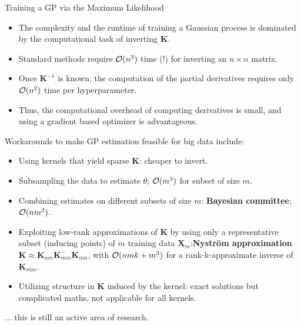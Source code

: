 \begin{frame}[c,allowframebreaks]{Training a GP via the Maximum Likelihood}
\begin{itemize}
  \item The complexity and the runtime of training a Gaussian process is dominated by the computational task of inverting $\bm{K}$.
  \lz
  \item Standard methods require $\mathcal{O}(n^3)$ time (!) for inverting an $n\times n$ matrix.
  \lz
  \item Once $\bm{K}^{-1}$ is known, the computation of the partial derivatives requires only $\mathcal{O}(n^2)$ time per hyperparameter.
  \lz
  \item[\faLightbulbO] Thus, the computational overhead of computing derivatives is small, and using a gradient based optimizer is advantageous.
\end{itemize}


\framebreak
Workarounds to make GP estimation feasible for big data include:

\begin{itemize}
\item Using kernels that yield sparse $\bm K$: cheaper to invert.
\vspace{3mm}
\item Subsampling the data to estimate $\theta$; $\mathcal{O}(m^3)$ for subset of size $m$.
\vspace{3mm}
\item Combining estimates on different subsets of size $m$: \textbf{Bayesian committee}; $\mathcal{O}(n m^2)$.
\vspace{3mm}
\item Exploiting low-rank approximations of $\bm{K}$ by using only a representative subset (inducing points) of $m$ training data $\bm X_m$:\textbf{Nyström approximation} $\bm K\approx\bm K_{nm} \bm K_{mm}^{-} \bm K_{mn}$, with $\mathcal{O}(nmk + m^3)$ for a rank-k-approximate inverse of $\bm K_{mm}$.
\vspace{3mm}
\item Utilizing structure in $\bm{K}$ induced by the kernel: exact solutions but complicated maths, not applicable for all kernels.
\end{itemize}

\vspace{3mm}
... this is still an active area of research.




\end{frame}


